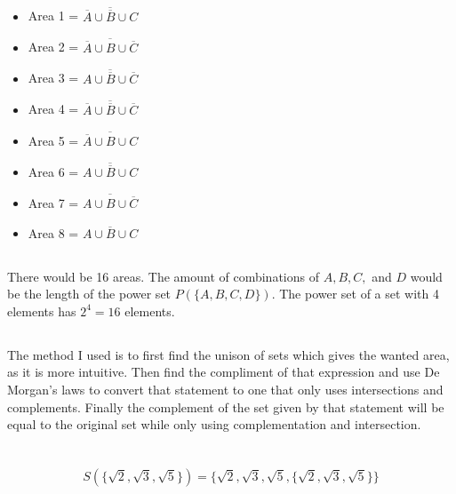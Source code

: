 \documentclass{article}
\begin{document}
\subsection{}
\begin{itemize}
\item Area 1 = $ \overline{ \overline{A} \cup \overline{B} \cup C } $
\item Area 2 = $ \overline{ \overline{A} \cup B \cup \overline{C} } $ 	
\item Area 3 = $ \overline{ A \cup \overline{B} \cup \overline{C} } $
\item Area 4 = $ \overline{ \overline{A} \cup \overline{B} \cup \overline{C}}$
\item Area 5 = $ \overline{ \overline{A} \cup B \cup C } $ 
\item Area 6 = $ \overline{ A \cup \overline{B} \cup C } $
\item Area 7 = $ \overline{ A \cup B \cup \overline{C} } $
\item Area 8 = $\overline{ A \cup B \cup C }$
\end{itemize}

\subsection{}
There would be 16 areas. The amount of combinations of $A, B, C,$ and $D$ would be the length of the power set $P ( \{ A, B, C, D \} )$. The power set of a set with 4 elements has $2^4 = 16$ elements.

\subsection{}
The method I used is to first find the unison of sets which gives the wanted area, as it is more intuitive. Then find the compliment of that expression and use De Morgan's laws to convert that statement to one that only uses intersections and complements. Finally the complement of the set given by that statement will be equal to the original set while only using complementation and intersection.

\section{}
\subsection{}
\begin{equation*}
    S(\{ \sqrt{2}, \sqrt{3}, \sqrt{5} \}) = 
    \{ \sqrt{2}, \sqrt{3}, \sqrt{5} , \{ \sqrt{2}, \sqrt{3}, \sqrt{5} \} \}
\end{equation*}
\end{document}

